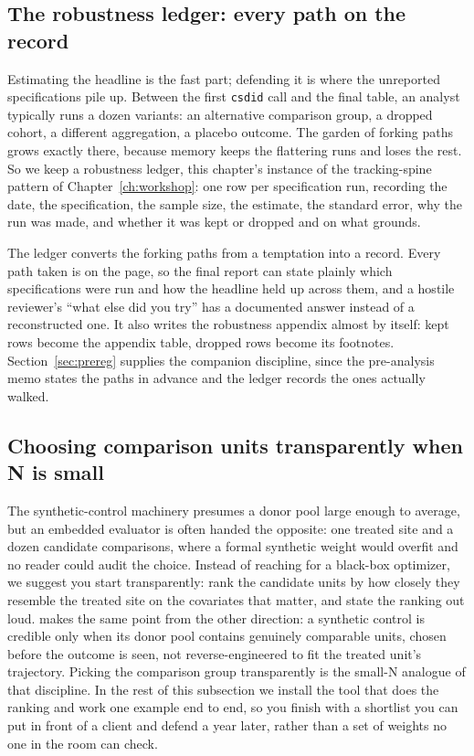 \documentclass[
    a4paper,
    fontsize=10pt,
    twoside=true,
    numbers=noenddot,
]{kaobook}
\begin{document}
\subsection{The robustness ledger: every path on the record}\label{ch08-sc-ledger}
Estimating the headline is the fast part; defending it is where the unreported specifications pile up. Between the first \texttt{csdid} call and the final table, an analyst typically runs a dozen variants: an alternative comparison group, a dropped cohort, a different aggregation, a placebo outcome. The garden of forking paths grows exactly there, because memory keeps the flattering runs and loses the rest. So we keep a robustness ledger, this chapter's instance of the tracking-spine pattern of Chapter~\ref{ch:workshop}: one row per specification run, recording the date, the specification, the sample size, the estimate, the standard error, why the run was made, and whether it was kept or dropped and on what grounds.

The ledger converts the forking paths from a temptation into a record. Every path taken is on the page, so the final report can state plainly which specifications were run and how the headline held up across them, and a hostile reviewer's \enquote{what else did you try} has a documented answer instead of a reconstructed one. It also writes the robustness appendix almost by itself: kept rows become the appendix table, dropped rows become its footnotes. Section~\ref{sec:prereg} supplies the companion discipline, since the pre-analysis memo states the paths in advance and the ledger records the ones actually walked.

\subsection{Choosing comparison units transparently when N is small}\label{ch08-sec:twins}
The synthetic-control machinery presumes a donor pool large enough to average, but an embedded evaluator is often handed the opposite: one treated site and a dozen candidate comparisons, where a formal synthetic weight would overfit and no reader could audit the choice. Instead of reaching for a black-box optimizer, we suggest you start transparently: rank the candidate units by how closely they resemble the treated site on the covariates that matter, and state the ranking out loud. \textcite{abadie2021synth} makes the same point from the other direction: a synthetic control is credible only when its donor pool contains genuinely comparable units, chosen before the outcome is seen, not reverse-engineered to fit the treated unit's trajectory. Picking the comparison group transparently is the small-N analogue of that discipline. In the rest of this subsection we install the tool that does the ranking and work one example end to end, so you finish with a shortlist you can put in front of a client and defend a year later, rather than a set of weights no one in the room can check.
\end{document}
